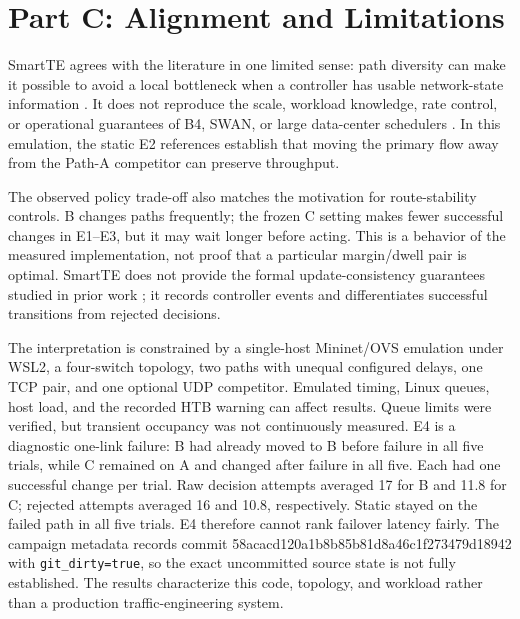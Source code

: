 \section{Part C: Alignment and Limitations}
SmartTE agrees with the literature in one limited sense: path diversity can make it possible to avoid a local bottleneck when a controller has usable network-state information \cite{hedera,microte}. It does not reproduce the scale, workload knowledge, rate control, or operational guarantees of B4, SWAN, or large data-center schedulers \cite{b4,swan}. In this emulation, the static E2 references establish that moving the primary flow away from the Path-A competitor can preserve throughput.

The observed policy trade-off also matches the motivation for route-stability controls. B changes paths frequently; the frozen C setting makes fewer successful changes in E1--E3, but it may wait longer before acting. This is a behavior of the measured implementation, not proof that a particular margin/dwell pair is optimal. SmartTE does not provide the formal update-consistency guarantees studied in prior work \cite{reitblatt}; it records controller events and differentiates successful transitions from rejected decisions.

The interpretation is constrained by a single-host Mininet/OVS emulation under WSL2, a four-switch topology, two paths with unequal configured delays, one TCP pair, and one optional UDP competitor. Emulated timing, Linux queues, host load, and the recorded HTB warning can affect results. Queue limits were verified, but transient occupancy was not continuously measured. E4 is a diagnostic one-link failure: B had already moved to B before failure in all five trials, while C remained on A and changed after failure in all five. Each had one successful change per trial. Raw decision attempts averaged 17 for B and 11.8 for C; rejected attempts averaged 16 and 10.8, respectively. Static stayed on the failed path in all five trials. E4 therefore cannot rank failover latency fairly. The campaign metadata records commit 58acacd120a1b8b85b81d8a46c1f273479d18942 with \texttt{git\_dirty=true}, so the exact uncommitted source state is not fully established. The results characterize this code, topology, and workload rather than a production traffic-engineering system.
